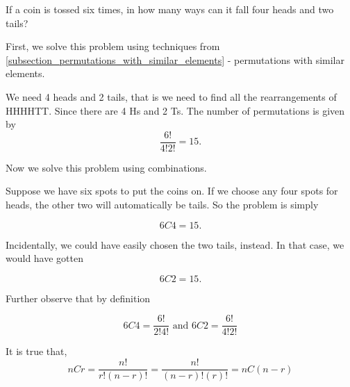\begin{example}
    If a coin is tossed six times, in how many ways can it fall four heads and two tails?
\end{example}
\begin{solution}
    First, we solve this problem using techniques from \ref{subsection_permutations_with_similar_elements} - permutations with similar elements.

    We need 4 heads and 2 tails, that is we need to find all the rearrangements of HHHHTT. Since there are 4 Hs and 2 Ts. The number of permutations is given by \[\frac{6!}{4!2!} = 15.\]

    Now we solve this problem using combinations.

    Suppose we have six spots to put the coins on. If we choose any four spots for heads, the other two will automatically be tails. So the problem is simply

    \[6C4 = 15.\]

    Incidentally, we could have easily chosen the two tails, instead. In that case, we would have gotten

    \[6C2 = 15.\]

    Further observe that by definition

    \[6C4 = \frac{6!}{2!4!} \text{ and } 6C2 = \frac{6!}{4!2!}\]
\end{solution}

\begin{note}
    It is true that,
    \[nCr = \frac{n!}{r!(n-r)!} = \frac{n!}{(n-r)!(r)!} = nC(n-r)\]
\end{note}